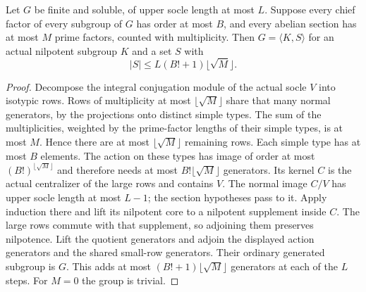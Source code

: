 \begin{lemma}\label{lem:bounded-core}
Let $G$ be finite and soluble, of upper socle length at most $L$.
Suppose every chief factor of every subgroup of $G$ has order at most $B$,
and every abelian section has at most $M$ prime factors, counted with
multiplicity. Then $G=\langle K,S\rangle$ for an actual nilpotent subgroup
$K$ and a set $S$ with
\[
 |S|\leq L(B!+1)\lfloor\sqrt M\rfloor.
\]
\end{lemma}
\begin{proof}
Decompose the integral conjugation module of the actual socle $V$ into
isotypic rows. Rows of multiplicity at most $\lfloor\sqrt M\rfloor$
share that many normal generators, by the projections onto distinct simple
types. The sum of the multiplicities, weighted by the prime-factor lengths
of their simple types, is at most $M$. Hence there are at most
$\lfloor\sqrt M\rfloor$ remaining rows. Each simple type has at most $B$
elements. The action on these types has image of order at most
$(B!)^{\lfloor\sqrt M\rfloor}$ and therefore needs at most
$B!\lfloor\sqrt M\rfloor$ generators.
Its kernel $C$ is the actual centralizer of the large rows and contains
$V$. The normal image $C/V$ has upper socle length at most $L-1$;
the section hypotheses pass to it. Apply induction there and lift its
nilpotent core to a nilpotent supplement inside $C$. The large rows
commute with that supplement, so adjoining them preserves nilpotence.
Lift the quotient generators and adjoin the displayed action generators
and the shared small-row generators. Their ordinary generated subgroup
is $G$. This adds at most $(B!+1)\lfloor\sqrt M\rfloor$ generators
at each of the $L$ steps. For $M=0$ the group is trivial.
\end{proof}

